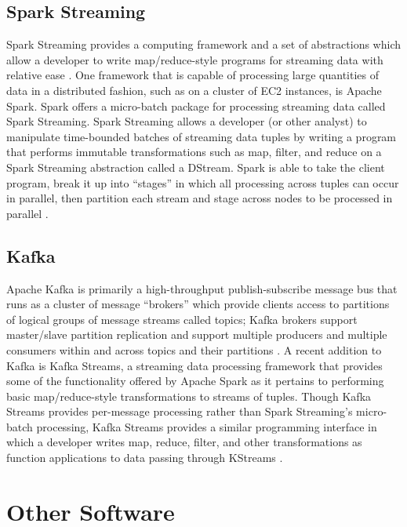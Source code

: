 \documentclass{thesis}
\begin{document}
    \subsection{Spark Streaming}
        Spark Streaming provides a computing framework and a set of abstractions which allow
        a developer to write map/reduce-style programs for streaming data with relative ease \cite{spark:streaming}.
        One framework that is capable of processing large quantities of data in a distributed fashion,
        such as on a cluster of EC2 instances, is Apache Spark. Spark offers a micro-batch package for
        processing streaming data called Spark Streaming. Spark Streaming allows a developer (or other
        analyst) to manipulate time-bounded batches of streaming data tuples by writing a program that
        performs immutable transformations such as map, filter, and reduce on a Spark Streaming abstraction
        called a DStream. Spark is able to take the client program, break it up into ``stages'' in which
        all processing across tuples can occur in parallel, then partition each stream and stage
        across nodes to be processed in parallel %
        \cite{spark:streaming}.

    \subsection{Kafka}
        Apache Kafka is primarily a high-throughput publish-subscribe message bus that runs as a cluster
        of message ``brokers'' which provide clients access to partitions of logical groups of message streams
        called topics; Kafka brokers support master/slave partition replication and support multiple
        producers and multiple consumers within and across topics and their partitions \cite{kafka}.
        A recent addition to Kafka is Kafka Streams, a streaming data processing framework that
        provides some of the functionality offered by Apache Spark as it pertains to performing basic
        map/reduce-style transformations to streams of tuples. Though Kafka Streams provides per-message
        processing rather than Spark Streaming's micro-batch processing, Kafka Streams provides a similar
        programming interface in which a developer writes map, reduce, filter, and other
        transformations as function applications to data passing through KStreams \cite{kafka:streams}.
    \section{Other Software}
\end{document}
